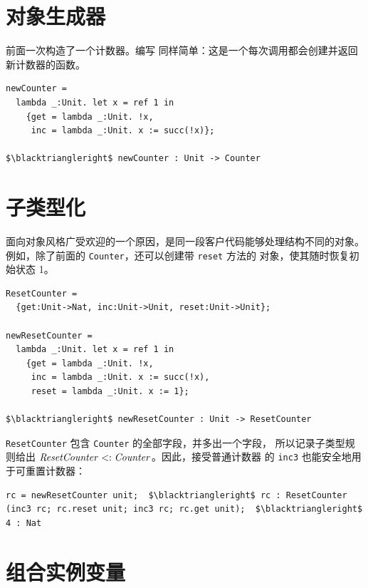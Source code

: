 \section{对象生成器}
\label{sec:18.3}

前面一次构造了一个计数器。编写
同样简单：这是一个每次调用都会创建并返回新计数器的函数。

\begin{lstlisting}[mathescape=true]
newCounter =
  lambda _:Unit. let x = ref 1 in
    {get = lambda _:Unit. !x,
     inc = lambda _:Unit. x := succ(!x)};

$\blacktriangleright$ newCounter : Unit -> Counter
\end{lstlisting}

\section{子类型化}
\label{sec:18.4}

面向对象风格广受欢迎的一个原因，是同一段客户代码能够处理结构不同的对象。
例如，除了前面的 \texttt{Counter}，还可以创建带 \texttt{reset} 方法的
对象，使其随时恢复初始状态 1。

\begin{lstlisting}[mathescape=true]
ResetCounter =
  {get:Unit->Nat, inc:Unit->Unit, reset:Unit->Unit};

newResetCounter =
  lambda _:Unit. let x = ref 1 in
    {get = lambda _:Unit. !x,
     inc = lambda _:Unit. x := succ(!x),
     reset = lambda _:Unit. x := 1};

$\blacktriangleright$ newResetCounter : Unit -> ResetCounter
\end{lstlisting}

\texttt{ResetCounter} 包含 \texttt{Counter} 的全部字段，并多出一个字段，
所以记录子类型规则给出
\(\mathit{ResetCounter}\mathrel{<:}\mathit{Counter}\)。因此，接受普通计数器
的 \texttt{inc3} 也能安全地用于可重置计数器：

\begin{lstlisting}[mathescape=true]
rc = newResetCounter unit;  $\blacktriangleright$ rc : ResetCounter
(inc3 rc; rc.reset unit; inc3 rc; rc.get unit);  $\blacktriangleright$ 4 : Nat
\end{lstlisting}

\section{组合实例变量}
\label{sec:18.5}

